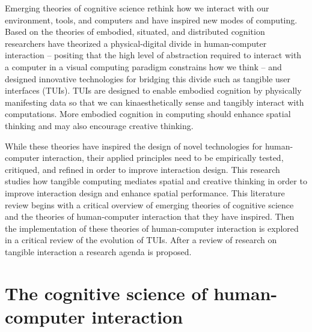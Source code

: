 \documentclass{article}
\begin{document}
Emerging theories of cognitive science rethink how we interact with our environment, tools, and computers 
and have inspired new modes of computing. 
Based on the theories of embodied, situated, and distributed cognition 
researchers have theorized a physical-digital divide in human-computer interaction --
positing that 
the high level of abstraction required to interact with a computer in a visual computing paradigm 
constrains how we think -- 
and designed innovative technologies for bridging this divide such as tangible user interfaces (TUIs). 
TUIs are designed to enable embodied cognition %
by physically manifesting data so that we can kinaesthetically sense and tangibly interact with computations.
More embodied cognition in computing should enhance spatial thinking and may also encourage creative thinking.

While these theories have inspired the design of novel technologies for human-computer interaction,
their applied principles need to be empirically tested, critiqued, and refined in order to improve interaction design.  
This research studies how tangible computing mediates spatial and creative thinking in order to improve interaction design and enhance spatial performance. 
This literature review begins with a critical overview of 
emerging theories of cognitive science and the theories of human-computer interaction that they have inspired.
Then the implementation of these theories of human-computer interaction is explored 
in a critical review of the evolution of TUIs. 
After a review of research on tangible interaction a research agenda is proposed.




\section{The cognitive science of human-computer interaction}
\end{document}
